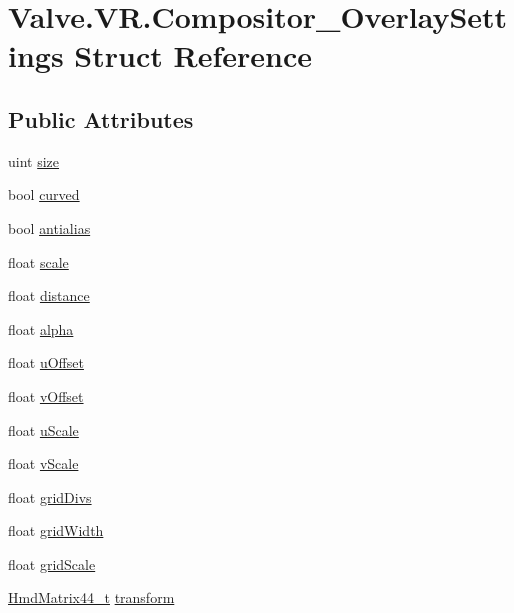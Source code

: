 \hypertarget{struct_valve_1_1_v_r_1_1_compositor___overlay_settings}{}\section{Valve.\+V\+R.\+Compositor\+\_\+\+Overlay\+Settings Struct Reference}
\label{struct_valve_1_1_v_r_1_1_compositor___overlay_settings}
\subsection*{Public Attributes}
\begin{DoxyCompactItemize}
\item 
uint \mbox{\hyperlink{struct_valve_1_1_v_r_1_1_compositor___overlay_settings_a84f097073b040be08c66d9b8aa65591d}{size}}
\item 
bool \mbox{\hyperlink{struct_valve_1_1_v_r_1_1_compositor___overlay_settings_a43920fa5a23619de7423b4dcaf1c32a6}{curved}}
\item 
bool \mbox{\hyperlink{struct_valve_1_1_v_r_1_1_compositor___overlay_settings_ac3987939d20d5d9e147c5a26f7a0dda7}{antialias}}
\item 
float \mbox{\hyperlink{struct_valve_1_1_v_r_1_1_compositor___overlay_settings_a324baf944a3bb65d314aaee9493ce9e8}{scale}}
\item 
float \mbox{\hyperlink{struct_valve_1_1_v_r_1_1_compositor___overlay_settings_a30967b25f9a56ebb1ceb0b4fa74febd3}{distance}}
\item 
float \mbox{\hyperlink{struct_valve_1_1_v_r_1_1_compositor___overlay_settings_a881294289966643b5d73e2dfa13a1004}{alpha}}
\item 
float \mbox{\hyperlink{struct_valve_1_1_v_r_1_1_compositor___overlay_settings_a4dde9a0c3a850a7bf9da49387fd4243f}{u\+Offset}}
\item 
float \mbox{\hyperlink{struct_valve_1_1_v_r_1_1_compositor___overlay_settings_a27da175e903850a65ff7184405772f3c}{v\+Offset}}
\item 
float \mbox{\hyperlink{struct_valve_1_1_v_r_1_1_compositor___overlay_settings_a2eca22c07dd3dffe56b2f8f41c00ebe2}{u\+Scale}}
\item 
float \mbox{\hyperlink{struct_valve_1_1_v_r_1_1_compositor___overlay_settings_acd180aed43547fdb737baa493fb6a485}{v\+Scale}}
\item 
float \mbox{\hyperlink{struct_valve_1_1_v_r_1_1_compositor___overlay_settings_a4a4d6389d393ea29c92fac42ba61c30a}{grid\+Divs}}
\item 
float \mbox{\hyperlink{struct_valve_1_1_v_r_1_1_compositor___overlay_settings_a03ce56f257a85b318cc293c30a4c1882}{grid\+Width}}
\item 
float \mbox{\hyperlink{struct_valve_1_1_v_r_1_1_compositor___overlay_settings_aae938e9970678f802e1b06ed144c3594}{grid\+Scale}}
\item 
\mbox{\hyperlink{struct_valve_1_1_v_r_1_1_hmd_matrix44__t}{Hmd\+Matrix44\+\_\+t}} \mbox{\hyperlink{struct_valve_1_1_v_r_1_1_compositor___overlay_settings_aa9dbdd8b9f60821b177c2fa54998ed46}{transform}}
\end{DoxyCompactItemize}


